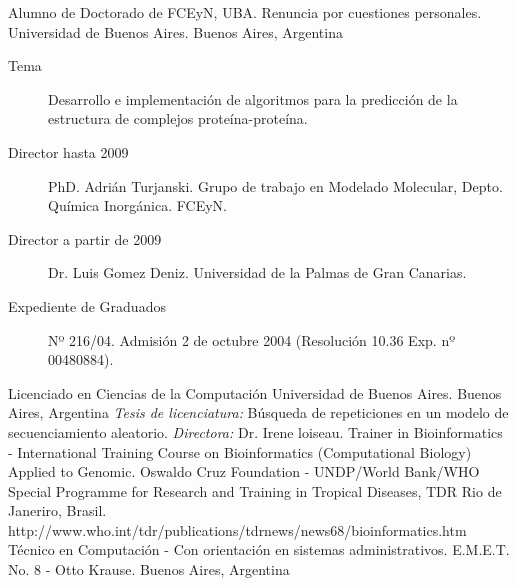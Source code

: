 	{Alumno de Doctorado de FCEyN, UBA. Renuncia por cuestiones personales.}
	{Universidad de Buenos Aires.}
	{Buenos Aires, Argentina}
	{}
	{\begin{description}
	\item [Tema] Desarrollo e implementación de algoritmos para la predicción de la estructura de complejos proteína-proteína.
	\item [Director hasta 2009] PhD. Adrián Turjanski. Grupo de trabajo en Modelado Molecular, Depto. Química Inorgánica. FCEyN.	
	\item [Director a partir de 2009] Dr. Luis Gomez Deniz. Universidad de la Palmas de Gran Canarias.
	\item [Expediente de Graduados] Nº 216/04. Admisión 2 de octubre 2004 (Resolución 10.36	Exp. nº 00480884).
	\end{description}}
	{Licenciado en Ciencias de la Computación}
	{Universidad de Buenos Aires.}
	{Buenos Aires, Argentina}
	{}
	{\emph{Tesis de licenciatura:} Búsqueda de repeticiones en un
	modelo de secuenciamiento aleatorio. \emph{Directora:} Dr. Irene loiseau.}
	{Trainer in Bioinformatics - International Training Course on Bioinformatics (Computational Biology) Applied to Genomic.}
	{Oswaldo Cruz Foundation - UNDP/World Bank/WHO Special Programme for Research and Training in Tropical Diseases, TDR}
	{Rio de Janeriro, Brasil.}
	{}
	{http://www.who.int/tdr/publications/tdrnews/news68/bioinformatics.htm}
	{Técnico en Computación - Con orientación en sistemas administrativos.}
	{E.M.E.T. No. 8 - Otto Krause.}
	{Buenos Aires, Argentina}
	{}
	{}

\label{otros:hasta}


